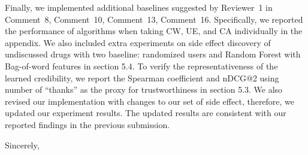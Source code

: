 \documentclass[11pt,a4paper]{letter} %
\begin{document}
\begin{letter}
Finally, we implemented additional baselines suggested by Reviewer~1 in Comment~8, Comment~10, Comment~13, Comment~16. Specifically, we reported the performance of algorithms when taking CW, UE, and CA individually in the appendix. We also included extra experiments on side effect discovery of undiscussed drugs with two baseline: randomized users and Random Forest with Bag-of-word features in section 5.4. To verify the representativeness of the learned credibility, we report the Spearman coefficient and nDCG@2 using number of ``thanks'' as the proxy for trustworthiness in section 5.3. We also revised our implementation with changes to our set of side effect, therefore, we updated our experiment results. The updated results are consistent with our reported findings in the previous submission.

\closing{Sincerely,}


\end{letter}
\end{document}
